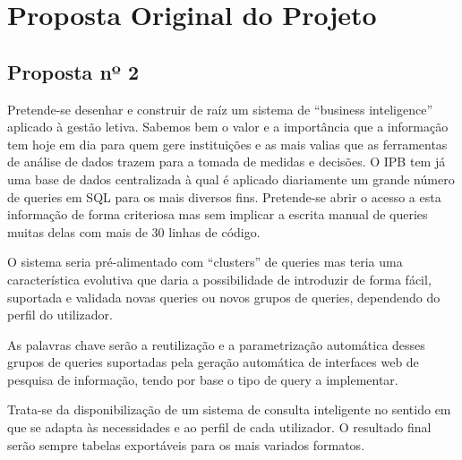 \chapter{Proposta Original do Projeto}\label{apendice1}
\section{Proposta nº 2}

Pretende-se desenhar e construir de raíz um sistema de “business inteligence” aplicado à gestão letiva. Sabemos bem o valor e a importância que a informação tem hoje em dia para quem gere instituições e as mais valias que as ferramentas de análise de dados trazem para a tomada de medidas e decisões. O IPB tem já uma base de dados centralizada à qual é aplicado diariamente um grande número de queries em SQL para os mais diversos fins. Pretende-se abrir o acesso a esta informação de forma criteriosa mas sem implicar a escrita manual de queries muitas delas com mais de 30 linhas de código.

O sistema seria pré-alimentado com “clusters” de queries mas teria uma característica evolutiva que daria a possibilidade de introduzir de forma fácil, suportada e validada novas queries ou novos grupos de queries, dependendo do perfil do utilizador.

As palavras chave serão a reutilização e a parametrização automática desses grupos de queries suportadas pela geração automática de interfaces web de pesquisa de informação, tendo por base o tipo de query a implementar.

Trata-se da disponibilização de um sistema de consulta inteligente no sentido em que se adapta às necessidades e ao perfil de cada utilizador. O resultado final serão sempre tabelas exportáveis para os mais variados formatos.
